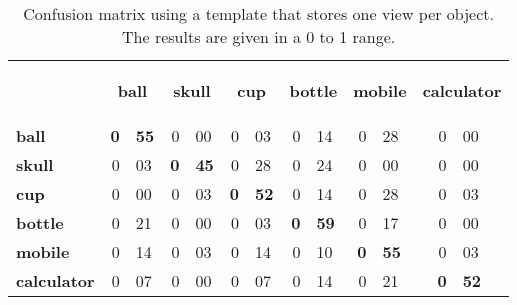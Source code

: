 


		\begin{table}[H]
		\centering
		\begin{tabular} {l r@{.}l r@{.}l r@{.}l r@{.}l r@{.}l r@{.}l }
		\toprule
		\addlinespace[3mm]
		   \multicolumn{1}{c}{\begin{center}\textbf{Real} \mid \textbf{Predicted}\end{center}} &
		   \multicolumn{2}{c}{\begin{flushright}\textbf{ball}\end{flushright}} &
		   \multicolumn{2}{c}{\begin{flushright}\textbf{skull}\end{flushright}} &
		   \multicolumn{2}{c}{\begin{flushright}\textbf{cup}\end{flushright}} &
		   \multicolumn{2}{c}{\begin{flushright}\textbf{bottle}\end{flushright}} &
		   \multicolumn{2}{c}{\begin{flushright}\textbf{mobile}\end{flushright}} &
		   \multicolumn{2}{c}{\begin{flushright}\textbf{calculator}\end{flushright}} &\\

		\addlinespace[-3mm]

		\midrule
		\textbf{ball}		&	\textbf{0}&\textbf{55}	&	0&00	&	0&03	&	0&14	&	0&28	&	0&00	\\
		\textbf{skull}		&	0&03	&	\textbf{0}&\textbf{45}	&	0&28	&	0&24	&	0&00	&	0&00	\\
		\textbf{cup}		&	0&00	&	0&03	&	\textbf{0}&\textbf{52}	&	0&14	&	0&28	&	0&03	\\
		\textbf{bottle}		&	0&21	&	0&00	&	0&03	&	\textbf{0}&\textbf{59}	&	0&17	&	0&00	\\
		\textbf{mobile}		&	0&14	&	0&03	&	0&14	&	0&10	&	\textbf{0}&\textbf{55}	&	0&03	\\
		\textbf{calculator}	&	0&07	&	0&00	&	0&07	&	0&14	&	0&21	&	\textbf{0}&\textbf{52}	\\
		\bottomrule
		\end{tabular}
		\caption[Confusion matrix - templates using 1 view]{Confusion matrix using a template that stores one view per object. The results are given in a 0 to 1 range. }
		\label{1view_matrix}
		\end{table}
